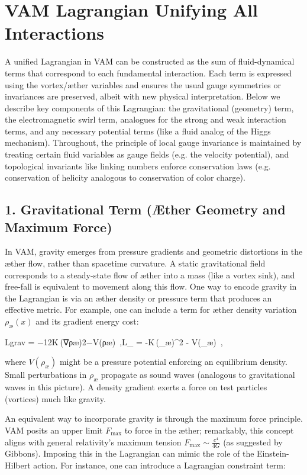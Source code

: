 \section*{VAM Lagrangian Unifying All Interactions}

A unified Lagrangian in VAM can be constructed as the sum of fluid-dynamical terms that correspond to each fundamental interaction. Each term is expressed using the vortex/æther variables and ensures the usual gauge symmetries or invariances are preserved, albeit with new physical interpretation. Below we describe key components of this Lagrangian: the gravitational (geometry) term, the electromagnetic swirl term, analogues for the strong and weak interaction terms, and any necessary potential terms (like a fluid analog of the Higgs mechanism). Throughout, the principle of local gauge invariance is maintained by treating certain fluid variables as gauge fields (e.g. the velocity potential), and topological invariants like linking numbers enforce conservation laws (e.g. conservation of helicity analogous to conservation of color charge).


\subsection*{1. Gravitational Term (Æther Geometry and Maximum Force)}

In VAM, gravity emerges from pressure gradients and geometric distortions in the æther flow, rather than spacetime curvature. A static gravitational field corresponds to a steady-state flow of æther into a mass (like a vortex sink), and free-fall is equivalent to movement along this flow. One way to encode gravity in the Lagrangian is via an æther density or pressure term that produces an effective metric. For example, one can include a term for æther density variation $\rho_{æ}(x)$ and its gradient energy cost:

Lgrav  =  −12K (∇ρæ)2−V(ρæ) ,L_{} \;=\; -K\,(\nabla \rho_{æ})^2 - V(\rho_{æ})~,

where $V(\rho_{æ})$ might be a pressure potential enforcing an equilibrium density. Small perturbations in $\rho_{æ}$ propagate as sound waves (analogous to gravitational waves in this picture). A density gradient exerts a force on test particles (vortices) much like gravity.


An equivalent way to incorporate gravity is through the maximum force principle. VAM posits an upper limit $F_{\text{max}}$ to force in the æther; remarkably, this concept aligns with general relativity’s maximum tension $F_{\text{max}} \sim \frac{c^4}{4G}$ (as suggested by Gibbons). Imposing this in the Lagrangian can mimic the role of the Einstein-Hilbert action. For instance, one can introduce a Lagrangian constraint term:

